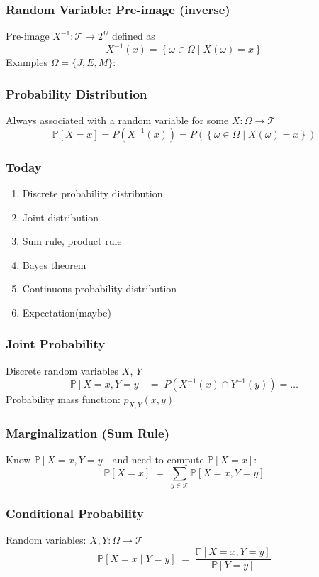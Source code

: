 \documentclass{beamer}
\renewcommand{\P}[1]{\mathbb{P}\left[#1\right]}
\begin{document}
\begin{frame} \frametitle{Random Variable: Pre-image (inverse)}
  Pre-image \( X^{-1} \colon \mathcal{T} \to 2^{\Omega}  \) defined as
  \[
   X^{-1}(x) = \left\{ \omega \in \Omega \mid X(\omega) = x  \right\} 
  \]
  Examples \( \Omega = \{ J, E, M \} \):
  \vspace{4cm} 
\end{frame}


\begin{frame} \frametitle{Probability Distribution}
  Always associated with a random variable for some $X\colon \Omega \to \mathcal{T}$
  \[
    \P{X = x} = P\left(X^{-1}(x)\right) = P \left(  \left\{ \omega \in \Omega \mid X(\omega) = x  \right\} \right)
  \]
  \vspace{4cm}
\end{frame}

\begin{frame} \frametitle{Today}
  \begin{enumerate}
  \item Discrete probability distribution
  \item Joint distribution
  \item Sum rule, product rule
  \item Bayes theorem
  \item Continuous probability distribution
  \item Expectation(maybe)
  \end{enumerate}
\end{frame}

\begin{frame} \frametitle{Joint Probability}
  Discrete random variables $X$, $Y$
  \[
   \P{X = x, Y = y} \; =\;  P(X^{-1}(x) \cap Y^{-1}(y)) = \ldots
  \]
  Probability mass function: $p_{X,Y}(x,y)$ \\[4cm]
\end{frame}

\begin{frame} \frametitle{Marginalization (Sum Rule)}
  Know $\P{X = x, Y = y}$ and need to compute $\P{X = x}$:
  \[
   \P{X = x}\;=\; \sum_{y\in \mathcal{T}} \P{X = x, Y = y} 
 \]
 \vspace{4.5cm}
\end{frame}

\begin{frame} \frametitle{Conditional Probability}
  Random variables: $X,Y \colon \Omega \to \mathcal{T} $
  \[
    \P{ X = x \mid Y = y } \; =\;  \frac{\P{ X = x, Y = y }}{\P{ Y = y }}
  \] 
  \vspace{4.5cm}
\end{frame}
\end{document}
